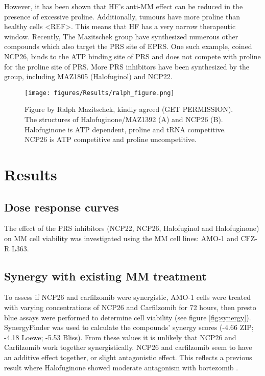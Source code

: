 However, it has been shown that HF’s anti-MM effect can be reduced in the presence of excessive proline.
Additionally, tumours have more proline than healthy cells <REF>.
This means that HF has a very narrow therapeutic window.
Recently, The Mazitschek group have synthesized numerous other compounds which also target the PRS site of EPRS. One such example, coined NCP26, binds to the ATP binding site of PRS and does not compete with proline for the proline site of PRS.
More PRS inhibitors have been synthesized by the group, including MAZ1805 (Halofuginol) and NCP22.

\begin{figure}[ht]
    \centering
    \texttt{[image: figures/Results/ralph\_figure.png]}
    \caption[Halofuginone and NCP26 structures]{Figure by Ralph Mazitschek, kindly agreed (GET PERMISSION).
    The structures of Halofuginone/MAZ1392 (A) and NCP26 (B).
    Halofuginone is ATP dependent, proline and tRNA competitive.
    NCP26 is ATP competitive and proline uncompetitive.
    }
    \label{fig:ralph_diagrams}
\end{figure}

\clearpage

\section{Results}

\subsection{Dose response curves}
The effect of the PRS inhibitors (NCP22, NCP26, Halofuginol and Halofuginone) on MM cell viability was investigated using the MM cell lines: AMO-1 and CFZ-R L363.

\subsection{Synergy with existing MM treatment}\label{subsec:synergy}
To assess if NCP26 and carfilzomib were synergistic, AMO-1 cells were treated with varying concentrations of NCP26 and Carfilzomib for 72 hours, then presto blue assays were performed to determine cell viability (see figure \ref{fig:synergy}).
SynergyFinder \cite{zheng2021synergyfinder} was used to calculate the compounds' synergy scores (-4.66 ZIP; -4.18 Loewe; -5.53 Bliss).
From these values it is unlikely that NCP26 and Carfilzomib work together synergistically.
NCP26 and carfilzomib seem to have an additive effect together, or slight antagonistic effect.
This reflects a previous result where Halofuginone showed moderate antagonism with bortezomib \cite{leiba2012halofuginone}.

